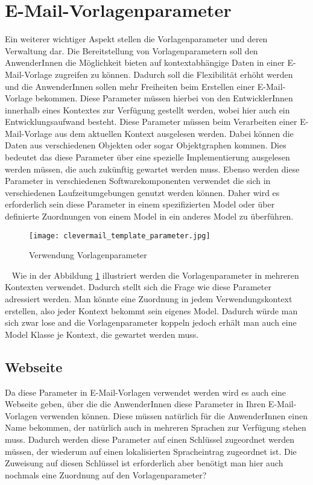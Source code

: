 \section{E-Mail-Vorlagenparameter}
Ein weiterer wichtiger Aspekt stellen die Vorlagenparameter und deren Verwaltung dar. Die Bereitstellung von Vorlagenparametern soll den AnwenderInnen die Möglichkeit bieten auf kontextabhängige Daten in einer E-Mail-Vorlage zugreifen zu können. Dadurch soll die Flexibilität erhöht werden und die AnwenderInnen sollen mehr Freiheiten beim Erstellen einer E-Mail-Vorlage bekommen. Diese Parameter müssen hierbei von den EntwicklerInnen innerhalb eines Kontextes zur Verfügung gestellt werden, wobei hier auch ein Entwicklungsaufwand besteht. Diese Parameter müssen beim Verarbeiten einer E-Mail-Vorlage aus dem aktuellen Kontext ausgelesen werden. Dabei können die Daten aus verschiedenen Objekten oder sogar Objektgraphen kommen. Dies bedeutet das diese Parameter über eine spezielle Implementierung ausgelesen werden müssen, die auch zukünftig gewartet werden muss. Ebenso werden diese Parameter in verschiedenen Softwarekomponenten verwendet die sich in verschiedenen Laufzeitumgebungen genutzt werden können. Daher wird es erforderlich sein diese Parameter in einem spezifizierten Model oder über definierte Zuordnungen von einem Model in ein anderes Model zu überführen.
\begin{figure}[h]
\centering
\texttt{[image: clevermail\_template\_parameter.jpg]}
\caption{Verwendung Vorlagenparameter}
\label{fig:clevermail-template-parameter}
\end{figure}
\ \newline
Wie in der Abbildung \ref{fig:clevermail-template-parameter} illustriert werden die Vorlagenparameter in mehreren Kontexten verwendet. Dadurch stellt sich die Frage wie diese Parameter adressiert werden. Man könnte eine Zuordnung in jedem Verwendungskontext erstellen, also jeder Kontext bekommt sein eigenes Model. Dadurch würde man sich zwar lose and die Vorlagenparameter koppeln jedoch erhält man auch eine Model Klasse je Kontext, die gewartet werden muss. 
\subsection{Webseite}
\label{sec:template-parameter-web-view}
Da diese Parameter in E-Mail-Vorlagen verwendet werden wird es auch eine Webseite geben, über die die AnwenderInnen diese Parameter in Ihren E-Mail-Vorlagen verwenden können. Diese müssen natürlich für die AnwenderInnen einen Name bekommen, der natürlich auch in mehreren Sprachen zur Verfügung stehen muss. Dadurch werden diese Parameter auf einen Schlüssel zugeordnet werden müssen, der wiederum auf einen lokalisierten Spracheintrag zugeordnet ist. Die Zuweisung auf diesen Schlüssel ist erforderlich aber benötigt man hier auch nochmals eine Zuordnung auf den Vorlagenparameter?
